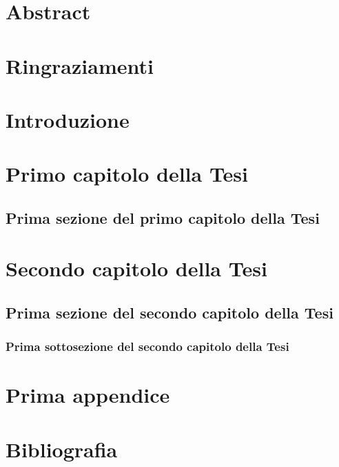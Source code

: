 \documentclass[twoside, openany]{TESI}
\begin{document}
\maketitle
\frontmatter
\chapter{Abstract}
\chapter{Ringraziamenti}
\tableofcontents
\mainmatter 
\chapter{Introduzione}
\chapter{Primo capitolo della Tesi}
\section{Prima sezione del primo capitolo della Tesi}
\chapter{Secondo capitolo della Tesi}
\section{Prima sezione del secondo capitolo della Tesi}
\subsection{Prima sottosezione del secondo capitolo della Tesi}
\appendix
\chapter{Prima appendice}
\backmatter 
\chapter{Bibliografia}
\end{document}
